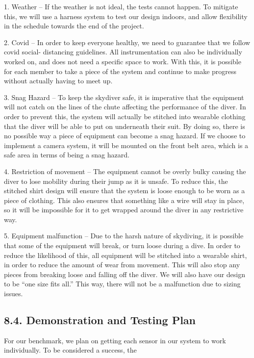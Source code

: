 \documentclass[10pt]{article}
\begin{document}
1. Weather -- If the weather is not ideal, the tests cannot happen. To mitigate this, we will use a harness system to test our design indoors, and allow flexibility in the schedule towards the end of the project.

2. Covid -- In order to keep everyone healthy, we need to guarantee that we follow covid social- distancing guidelines. All instrumentation can also be individually worked on, and does not need a specific space to work. With this, it is possible for each member to take a piece of the system and continue to make progress without actually having to meet up.

3. Snag Hazard -- To keep the skydiver safe, it is imperative that the equipment will not catch on the lines of the chute affecting the performance of the diver. In order to prevent this, the system will actually be stitched into wearable clothing that the diver will be able to put on underneath their suit. By doing so, there is no possible way a piece of equipment can become a snag hazard. If we choose to implement a camera system, it will be mounted on the front belt area, which is a safe area in terms of being a snag hazard.

4. Restriction of movement -- The equipment cannot be overly bulky causing the diver to lose mobility during their jump as it is unsafe. To reduce this, the stitched shirt design will ensure that the system is loose enough to be worn as a piece of clothing. This also ensures that something like a wire will stay in place, so it will be impossible for it to get wrapped around the diver in any restrictive way.

5. Equipment malfunction -- Due to the harsh nature of skydiving, it is possible that some of the equipment will break, or turn loose during a dive. In order to reduce the likelihood of this, all equipment will be stitched into a wearable shirt, in order to reduce the amount of wear from movement. This will also stop any pieces from breaking loose and falling off the diver. We will also have our design to be ``one size fits all.'' This way, there will not be a malfunction due to sizing issues.



\subsection{8.4. Demonstration and Testing Plan}

For our benchmark, we plan on getting each sensor in our system to work individually. To be considered a success, the
\end{document}
